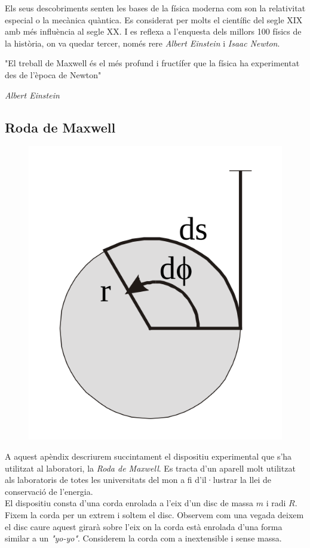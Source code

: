 \documentclass[11pt]{article}
\begin{document}
        Els seus descobriments senten les bases de la física moderna com son la relativitat especial o la mecànica quàntica. Es considerat per molts el científic del segle XIX amb més influència al segle XX. I es reflexa a l'enquesta dels millors 100 físics de la història, on va quedar tercer, només rere \textit{Albert Einstein} i \textit{Isaac Newton}.

        \epigraph{"El treball de Maxwell és el més profund i fructífer que la física ha experimentat des de l'època de Newton"}{\textit{Albert Einstein}}

    \vspace{-0.5cm}
    \subsection{Roda de Maxwell}\label{appendix:roda}
        \vspace{0.2cm}
        \begin{figure}
            \vspace{-1.1cm}
            \begin{center}
                \includegraphics[width=.255\textwidth]{fotos/rueda.png}
            \end{center}
        \end{figure}
        A aquest apèndix descriurem succintament el dispositiu experimental que s'ha utilitzat al laboratori, la \textit{Roda de Maxwell}. Es tracta d'un aparell molt utilitzat als laboratoris de totes les universitats del mon a fi d'il·lustrar la llei de conservació de l'energia.\\ 

        El dispositiu consta d'una corda enrolada a l'eix d'un disc de massa $m$ i radi $R$. Fixem la corda per un extrem i soltem el disc. Observem com una vegada deixem el disc caure aquest girarà sobre l'eix on la corda està enrolada d'una forma similar a un \textit{"yo-yo"}. Considerem la corda com a inextensible i sense massa.

    \clearpage
\end{document}
